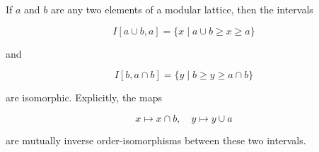 If $a$ and $b$ are any two elements of a modular lattice, then the intervals

$$I[a \cup b, a] = \{ x \mid a \cup b \geq x \geq a \}$$

and

$$I[b, a \cap b] = \{ y \mid b \geq y \geq a \cap b \}$$

are isomorphic. Explicitly, the maps

$$x \mapsto x \cap b, \quad y \mapsto y \cup a$$

are mutually inverse order-isomorphisms between these two intervals.
